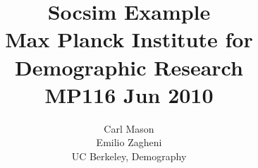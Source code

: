 \documentclass[11pt]{book}
\begin{document}

\title{Socsim Example\\
Max Planck Institute for Demographic Research\\
MP116  Jun 2010}
\author{Carl Mason\\
Emilio Zagheni\\
UC Berkeley, Demography}
\maketitle


%

%
%
%
%
%
\end{document}
